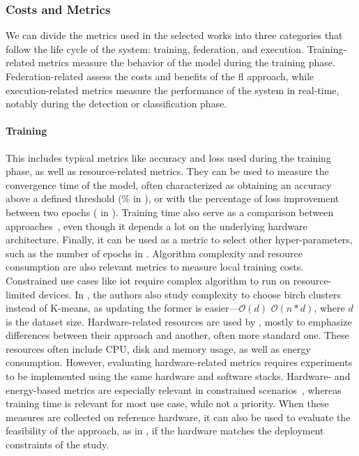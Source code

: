 \subsubsection{Costs and Metrics\label{sec:sota.quali.metrics}}

We can divide the metrics used in the selected works into three categories that follow the life cycle of the system: training, federation, and execution.
Training-related metrics measure the behavior of the model during the training phase.
Federation-related assess the costs and benefits of the \gls{fl} approach, while execution-related metrics measure the performance of the system in real-time, notably during the detection or classification phase.

\paragraph{Training}

This includes typical metrics like accuracy and loss used during the training phase, as well as resource-related metrics.
They can be used to measure the convergence time of the model, often characterized as obtaining an accuracy above a defined threshold (\% in \cite{chen_Networkanomalydetection_2020}), or with the percentage of loss improvement between two epochs ( in \cite{kim_CollaborativeAnomalyDetection_2020}). Training time also serve as a comparison between approaches~\cite{schneble_Attackdetectionusing_2019}, even though it depends a lot on the underlying hardware architecture. Finally, it can be used as a metric to select other hyper-parameters, such as the number of epochs in \cite{liu_BlockchainFederatedLearning_2021}.
Algorithm complexity and resource consumption are also relevant metrics to measure local training costs.
Constrained use cases like \gls{iot} require complex algorithm to run on resource-limited devices.
In \cite{pahl_AllEyesYou_2018}, the authors also study complexity to choose \gls{birch} clusters instead of K-means, as updating the former is easier---\(\mathcal{O}(d)\) \vs \(\mathcal{O}(n*d)\), where \(d\) is the dataset size.
Hardware-related resources are used by \cite{rathore_BlockSecIoTNetBlockchainbaseddecentralized_2019,zhao_MultiTaskNetworkAnomaly_2019}, mostly to emphasize differences between their approach and another, often more standard one.
These resources often include CPU, disk and memory usage, as well as energy consumption.
However, evaluating hardware-related metrics requires experiments to be implemented using the same hardware and software stacks.
Hardware- and energy-based metrics are especially relevant in constrained scenarios~\cite{nguyen_DIoTFederatedSelflearning_2019,schneble_Attackdetectionusing_2019}, whereas training time is relevant for most use case, while not a priority.
When these measures are collected on reference hardware, it can also be used to evaluate the feasibility of the approach, as in \cite{nguyen_DIoTFederatedSelflearning_2019}, if the hardware matches the deployment constraints of the study.

